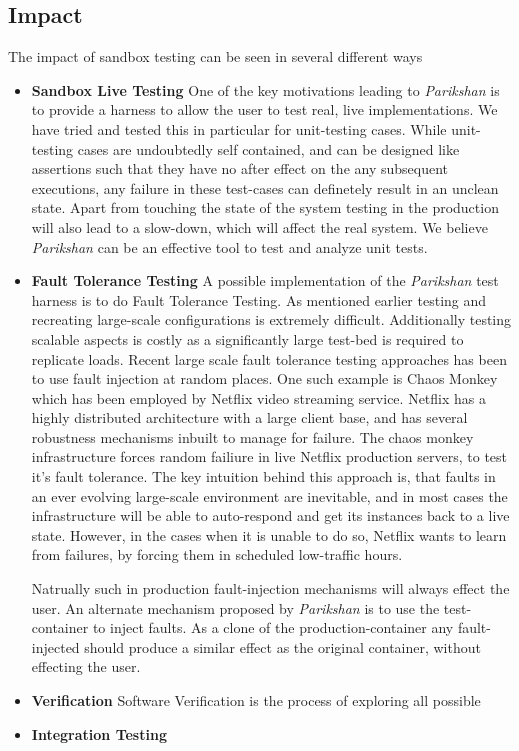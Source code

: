 \subsection{Impact}
\label{sec:impact}

The impact of sandbox testing can be seen in several different ways

\begin{itemize}
  \item \textbf{Sandbox Live Testing}
    One of the key motivations leading to \emph{Parikshan} is to provide a harness to allow the user to test real, live implementations. 
We have tried and tested this in particular for unit-testing cases. 
While unit-testing cases are undoubtedly self contained, and can be designed like assertions such that they have no after effect on the any subsequent executions, any failure in these test-cases can definetely result in an unclean state.
Apart from touching the state of the system testing in the production will also lead to a slow-down, which will affect the real system.
We believe \emph{Parikshan} can be an effective tool to test and analyze unit tests.

  \item \textbf{Fault Tolerance Testing}
    A possible implementation of the \emph{Parikshan} test harness is to do Fault Tolerance Testing.
As mentioned earlier testing and recreating large-scale configurations is extremely difficult.
Additionally testing scalable aspects is costly as a significantly large test-bed is required to replicate loads. 
Recent large scale fault tolerance testing approaches has been to use fault injection at random places.
One such example is Chaos Monkey\cite{chaosmonkey} which has been employed by Netflix \cite{netflix} video streaming service. 
Netflix has a highly distributed architecture with a large client base, and has several robustness mechanisms inbuilt to manage for failure. 
The chaos monkey infrastructure forces random failiure in live Netflix production servers, to test it's fault tolerance.
The key intuition behind this approach is, that faults in an ever evolving large-scale environment are inevitable, and in most cases the infrastructure will be able to auto-respond and get its instances back to a live state. 
However, in the cases when it is unable to do so, Netflix wants to learn from failures, by forcing them in scheduled low-traffic hours.

Natrually such in production fault-injection mechanisms will always effect the user. 
An alternate mechanism proposed by \emph{Parikshan} is to use the test-container to inject faults. 
As a clone of the production-container any fault-injected should produce a similar effect as the original container, without effecting the user.
  \item \textbf{Verification}
Software Verification is the process of exploring all possible 
  \item \textbf{Integration Testing}
\end{itemize}
